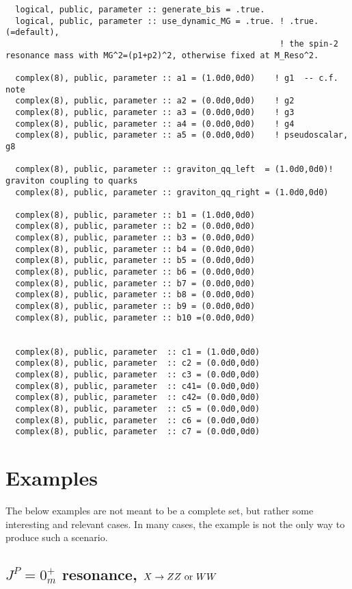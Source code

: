 \documentclass[aps,superscriptaddress,nofootinbib]{revtex4}
\begin{document}
\begin{verbatim}
  logical, public, parameter :: generate_bis = .true.
  logical, public, parameter :: use_dynamic_MG = .true. ! .true. (=default),
													    ! the spin-2 resonance mass with MG^2=(p1+p2)^2, otherwise fixed at M_Reso^2.

  complex(8), public, parameter :: a1 = (1.0d0,0d0)    ! g1  -- c.f. note
  complex(8), public, parameter :: a2 = (0.0d0,0d0)    ! g2
  complex(8), public, parameter :: a3 = (0.0d0,0d0)    ! g3
  complex(8), public, parameter :: a4 = (0.0d0,0d0)    ! g4
  complex(8), public, parameter :: a5 = (0.0d0,0d0)    ! pseudoscalar, g8

  complex(8), public, parameter :: graviton_qq_left  = (1.0d0,0d0)! graviton coupling to quarks
  complex(8), public, parameter :: graviton_qq_right = (1.0d0,0d0)

  complex(8), public, parameter :: b1 = (1.0d0,0d0)
  complex(8), public, parameter :: b2 = (0.0d0,0d0)
  complex(8), public, parameter :: b3 = (0.0d0,0d0)
  complex(8), public, parameter :: b4 = (0.0d0,0d0)
  complex(8), public, parameter :: b5 = (0.0d0,0d0)
  complex(8), public, parameter :: b6 = (0.0d0,0d0)
  complex(8), public, parameter :: b7 = (0.0d0,0d0)
  complex(8), public, parameter :: b8 = (0.0d0,0d0)
  complex(8), public, parameter :: b9 = (0.0d0,0d0)
  complex(8), public, parameter :: b10 =(0.0d0,0d0)


  complex(8), public, parameter  :: c1 = (1.0d0,0d0)
  complex(8), public, parameter  :: c2 = (0.0d0,0d0)
  complex(8), public, parameter  :: c3 = (0.0d0,0d0)
  complex(8), public, parameter  :: c41= (0.0d0,0d0)
  complex(8), public, parameter  :: c42= (0.0d0,0d0)
  complex(8), public, parameter  :: c5 = (0.0d0,0d0)
  complex(8), public, parameter  :: c6 = (0.0d0,0d0)
  complex(8), public, parameter  :: c7 = (0.0d0,0d0)
\end{verbatim}

\section{ Examples }

\noindent
The below examples are not meant to be a complete set, but rather some interesting and relevant cases.
In many cases, the example is not the only way to produce such a scenario.

\subsection{ $J^P = 0^+_m$ resonance, $X \to ZZ~{\rm or}~WW$}
\label{sec:exA}
\end{document}
